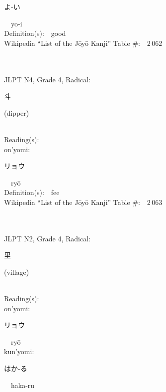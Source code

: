 \begin{multicols}{2}
{\hspace*{2em}}{\begin{CJK}{UTF8}{min} よ-い \end{CJK}}\ \ yo-i\ \ \\
Definition(s):\ \ good \\
Wikipedia ``List of the J\=oy\=o Kanji'' Table \#:\ \ 2\,062 \\
\ \ \\
{\fontsize{34pt}{40pt}  }\ \ \\  %
{JLPT N4, Grade 4, Radical:\ \ {\begin{CJK}{UTF8}{min} 斗 \end{CJK}} (dipper) } \\
Reading(s):\ \ \\
{\hspace*{1em}}on'yomi:\ \ \\
{\hspace*{2em}}{\begin{CJK}{UTF8}{min} リョウ \end{CJK}}\ \ ry\=o\ \ \\
Definition(s):\ \ fee \\
Wikipedia ``List of the J\=oy\=o Kanji'' Table \#:\ \ 2\,063 \\
\ \ \\
{\fontsize{34pt}{40pt}  }\ \ \\  %
{JLPT N2, Grade 4, Radical:\ \ {\begin{CJK}{UTF8}{min} 里 \end{CJK}} (village) } \\
Reading(s):\ \ \\
{\hspace*{1em}}on'yomi:\ \ \\
{\hspace*{2em}}{\begin{CJK}{UTF8}{min} リョウ \end{CJK}}\ \ ry\=o\ \ \\
{\hspace*{1em}}kun'yomi:\ \ \\
{\hspace*{2em}}{\begin{CJK}{UTF8}{min} はか-る \end{CJK}}\ \ haka-ru\ \ \\

\end{multicols}
